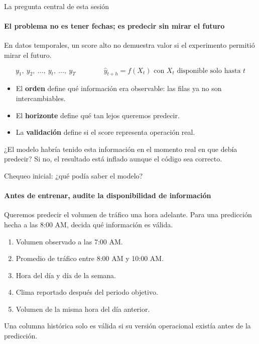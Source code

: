 \documentclass[aspectratio=169,11pt]{beamer}  %
\begin{document}
\begin{frame}{La pregunta central de esta sesión}
\framesubtitle{El problema no es tener fechas; es predecir sin mirar el futuro}
\begin{center}\large En datos temporales, un score alto no demuestra valor si el experimento permitió mirar el futuro.\end{center}
\[ y_1,\ y_2,\ \ldots,\ y_t,\ \ldots,\ y_T \qquad\qquad \hat y_{t+h} = f(X_t) \text{ con } X_t \text{ disponible solo hasta } t \]
\begin{itemize}\small
\item El \textbf{orden} define qué información era observable: las filas ya no son intercambiables.
\item El \textbf{horizonte} define qué tan lejos queremos predecir.
\item La \textbf{validación} define si el score representa operación real.
\end{itemize}
\begin{rulebox}
\small ¿El modelo habría tenido esta información en el momento real en que debía predecir? Si no, el resultado está inflado aunque el código sea correcto.
\end{rulebox}
\end{frame}

\begin{frame}{Chequeo inicial: ¿qué podía saber el modelo?}
\framesubtitle{Antes de entrenar, audite la disponibilidad de información}
\begin{taskbox}
Queremos predecir el volumen de tráfico una hora adelante. Para una predicción hecha a las 8:00 AM, decida qué información es válida.
\end{taskbox}
\begin{enumerate}
\item Volumen observado a las 7:00 AM.
\item Promedio de tráfico entre 8:00 AM y 10:00 AM.
\item Hora del día y día de la semana.
\item Clima reportado después del periodo objetivo.
\item Volumen de la misma hora del día anterior.
\end{enumerate}
Una columna histórica solo es válida si su versión operacional existía antes de la predicción.
\end{frame}

\end{document}
